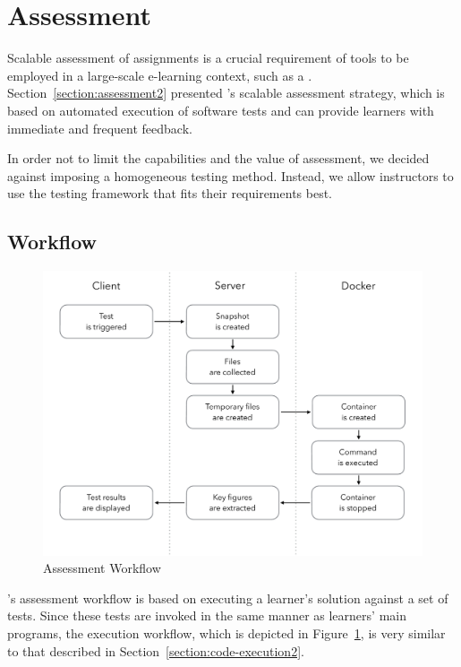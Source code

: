 \section{Assessment}\label{section:assessment3}

Scalable assessment of assignments is a crucial requirement of tools to be employed in a large-scale e-learning context, such as a \mooc. Section~\ref{section:assessment2} presented \tool's scalable assessment strategy, which is based on automated execution of software tests and can provide learners with immediate and frequent feedback.

In order not to limit the capabilities and the value of assessment, we decided against imposing a homogeneous testing method. Instead, we allow instructors to use the testing framework that fits their requirements best.

\subsection{Workflow}

\begin{figure}
\centering
\includegraphics[clip=true, trim=0.5cm 3cm 0.5cm 0.5cm, width=\textwidth]{images/assessment}
\caption{Assessment Workflow}
\label{figure:assessment}
\end{figure}

\tool's assessment workflow is based on executing a learner's solution against a set of tests. Since these tests are invoked in the same manner as learners' main programs, the execution workflow, which is depicted in Figure~\ref{figure:assessment}, is very similar to that described in Section~\ref{section:code-execution2}.

